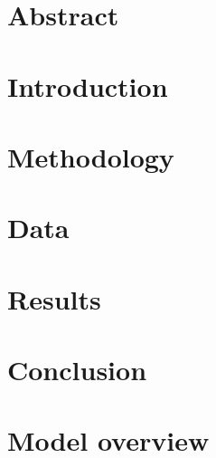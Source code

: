 \documentclass[a4paper,11pt]{report}
\begin{document}


\chapter*{Abstract}


\tableofcontents
\newpage

\chapter{Introduction}


\chapter{Methodology}


\chapter{Data}


\chapter{Results}


\chapter{Conclusion}


\appendix
\chapter{Model overview}


\printbibliography
\end{document}
